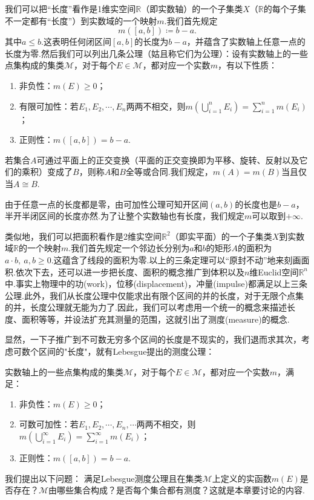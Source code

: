\documentclass[lang=cn,12pt]{ctexart}
\theoremstyle{definition}
\theoremstyle{plain}
\begin{document}
我们可以把“长度”看作是1维实空间$\mathbb{R}$（即实数轴）的一个子集类$X$（$\mathbb{R}$的每个子集不一定都有“长度”）到实数域的一个映射$m$.我们首先规定
$$m(\left[a,b\right])\coloneqq b-a.$$
其中$a\leqslant b$.这表明任何闭区间$\left[a,b\right]$的长度为$b-a$，并蕴含了实数轴上任意一点的长度为零.然后我们可以列出几条公理（姑且称它们为公理）：设有实数轴上的一些点集构成的集类$\mathcal{M}$，对于每个$E\in\mathcal{M}$，都对应一个实数$m$，有以下性质：
\begin{enumerate}
	\item 非负性：$m(E)\geqslant 0$；
	\item 有限可加性：若$E_1,E_2,\cdots,E_n$两两不相交，则$m\left(\bigcup\limits_{i=1}^{n}E_i\right)=\sum\limits_{i=1}^{n}m(E_i)$；
	\item 正则性：$m(\left[a,b\right])=b-a$.
\end{enumerate}
若集合$A$可通过平面上的正交变换（平面的正交变换即为平移、旋转、反射以及它们的乘积）变成了$B$，则称$A$和$B${\heiti 全等}或{\heiti 合同}.我们规定，$m(A)=m(B)$当且仅当$A\cong B$.

由于任意一点的长度都是零，由可加性公理可知开区间$(a,b)$的长度也是$b-a$，半开半闭区间的长度亦然.为了让整个实数轴也有长度，我们规定$m$可以取到$+\infty$.

类似地，我们可以把面积看作是2维实空间$\mathbb{R}^2$（即实平面）的一个子集类$X$到实数域$\mathbb{R}$的一个映射$m$.我们首先规定一个邻边长分别为$a$和$b$的矩形$A$的面积为$a\cdot b,\ a,b\geqslant 0$.这蕴含了线段的面积为零.以上的三条定理可以“原封不动”地来刻画面积.依次下去，还可以进一步把长度、面积的概念推广到体积以及$n$维Euclid空间$\mathbb{R}^n$中.事实上物理中的{\heiti 功}(work)，{\heiti 位移}(displacement)，{\heiti 冲量}(impulse)都满足以上三条公理.此外，我们从长度公理中仅能求出有限个区间的并的长度，对于无限个点集的并，长度公理就无能为力了.因此，我们可以考虑用一个统一的概念来描述长度、面积等等，并设法扩充其测量的范围，这就引出了{\heiti 测度}(measure)的概念.

显然，一下子推广到不可数无穷多个区间的长度是不现实的，我们退而求其次，考虑可数个区间的"长度"，就有Lebesgue提出的测度公理：

实数轴上的一些点集构成的集类$\mathcal{M}$，对于每个$E\in\mathcal{M}$，都对应一个实数$m$，满足：
\begin{enumerate}
	\item 非负性：$m(E)\geqslant 0$；
	\item 可数可加性：若$E_1,E_2,\cdots,E_n,\cdots$两两不相交，则$m\left(\bigcup\limits_{i=1}^{\infty}E_i\right)=\sum\limits_{i=1}^{\infty}m(E_i)$；
	\item 正则性：$m(\left[a,b\right])=b-a$.
\end{enumerate}
我们提出以下问题：
满足Lebesgue测度公理且在集类$\mathcal{M}$上定义的实函数$m(E)$是否存在？$\mathcal{M}$由哪些集合构成？是否每个集合都有测度？这就是本章要讨论的内容.
\end{document}
